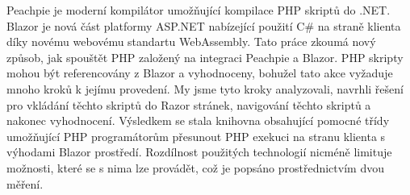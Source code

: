 \documentclass[12pt]{report}
\begin{document}
Peachpie je moderní kompilátor umožňující kompilace PHP skriptů do .NET.
Blazor je nová část platformy ASP.NET nabízející použití C\# na straně klienta díky novému webovému standartu WebAssembly.
Tato práce zkoumá nový způsob, jak spouštět PHP založený na integraci Peachpie a Blazor.
PHP skripty mohou být referencovány z Blazor a vyhodnoceny, bohužel tato akce vyžaduje mnoho kroků k jejímu provedení.
My jsme tyto kroky analyzovali, navrhli řešení pro vkládání těchto skriptů do Razor stránek, navigování těchto skriptů a nakonec vyhodnocení. 
Výsledkem se stala knihovna obsahující pomocné třídy umožňující PHP programátorům přesunout PHP exekuci na stranu klienta s výhodami Blazor prostředí.
Rozdílnost použitých technologií nicméně limituje možnosti, které se s nima lze provádět, což je popsáno prostřednictvím dvou měření.
\end{document}
